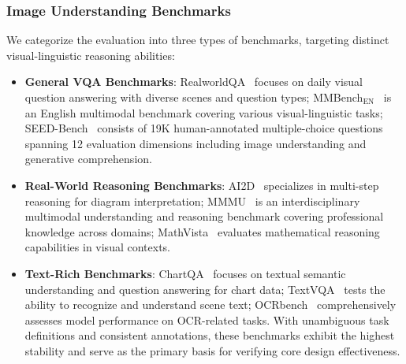 \documentclass[11pt, a4paper, logo, copyright]{googledeepmind}
\begin{document}
\subsubsection{Image Understanding Benchmarks}
We categorize the evaluation into three types of benchmarks, targeting distinct visual-linguistic reasoning abilities:
\begin{itemize}
    \item \textbf{General VQA Benchmarks}: %
    RealworldQA~\citep{grok} focuses on daily visual question answering with diverse scenes and question types; MMBench$_\text{EN}$~\citep{liu2024mmbench} is an English multimodal benchmark covering various visual-linguistic tasks; SEED-Bench~\citep{li2023seed} consists of 19K human-annotated multiple-choice questions spanning 12 evaluation dimensions including image understanding and generative comprehension. %
    \item \textbf{Real-World Reasoning Benchmarks}: %
    AI2D~\citep{kembhavi2016diagram} specializes in multi-step reasoning for diagram interpretation; MMMU~\citep{yue2024mmmu} is an interdisciplinary multimodal understanding and reasoning benchmark covering professional knowledge across domains; MathVista~\citep{lu2023mathvista} evaluates mathematical reasoning capabilities in visual contexts. %
    \item \textbf{Text-Rich Benchmarks}: %
    ChartQA~\citep{liu2024chatqa} focuses on textual semantic understanding and question answering for chart data; TextVQA~\citep{singh2019towards} tests the ability to recognize and understand scene text; OCRbench~\citep{Liu_2024} comprehensively assesses model performance on OCR-related tasks. With unambiguous task definitions and consistent annotations, these benchmarks exhibit the highest stability and serve as the primary basis for verifying core design effectiveness.
\end{itemize}
\end{document}
